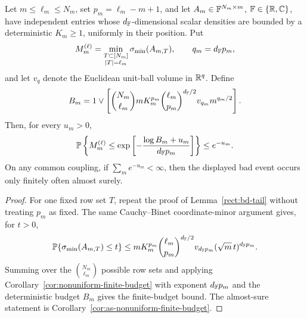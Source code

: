 \begin{corollary}\label{rect:moving-excess-finite-budget}
Let \(m\le\ell_m\le N_m\), set \(p_m=\ell_m-m+1\), and let
\(A_m\in\mathbb{F}^{N_m\times m}\), \(\mathbb{F}\in\{\mathbb{R},\mathbb{C}\}\), have independent entries whose
\(d_{\mathbb{F}}\)-dimensional scalar densities are bounded by a deterministic
\(K_m\ge1\), uniformly in their position.  Put
\[
  M_m^{(\ell)}=\min_{\substack{T\subset[N_m]\\ |T|=\ell_m}}\sigma_{\min}(A_{m,T}),
  \qquad q_m=d_{\mathbb{F}} p_m,
\]
and let \(v_q\) denote the Euclidean unit-ball volume in \(\mathbb{R}^q\).  Define
\[
  B_m
  =
  1\vee
  \left[
  \binom{N_m}{\ell_m}
  mK_m^{p_m}
  \binom{\ell_m}{p_m}^{d_{\mathbb{F}}/2}
  v_{q_m}m^{q_m/2}
  \right].
\]
Then, for every \(u_m>0\),
\[
  \mathbb{P}\left\{
  M_m^{(\ell)}
  \le
  \exp\left[-\frac{\log B_m+u_m}{d_{\mathbb{F}} p_m}\right]
  \right\}
  \le e^{-u_m}.
\]
On any common coupling, if \(\sum_m e^{-u_m}<\infty\), then the displayed bad
event occurs only finitely often almost surely.
\end{corollary}

\begin{proof}
For one fixed row set \(T\), repeat the proof of Lemma~\ref{rect:bd-tail}
without treating \(p_m\) as fixed.  The same Cauchy--Binet coordinate-minor
argument gives, for \(t>0\),
\[
  \mathbb{P}\{\sigma_{\min}(A_{m,T})\le t\}
  \le
  mK_m^{p_m}\binom{\ell_m}{p_m}^{d_{\mathbb{F}}/2}
  v_{d_{\mathbb{F}} p_m}(\sqrt m\,t)^{d_{\mathbb{F}} p_m}.
\]
Summing over the \(\binom{N_m}{\ell_m}\) possible row sets and applying
Corollary~\ref{cor:nonuniform-finite-budget} with exponent \(d_{\mathbb{F}} p_m\) and
the deterministic budget \(B_m\) gives the finite-budget bound.  The
almost-sure statement is Corollary~\ref{cor:as-nonuniform-finite-budget}.
\end{proof}


